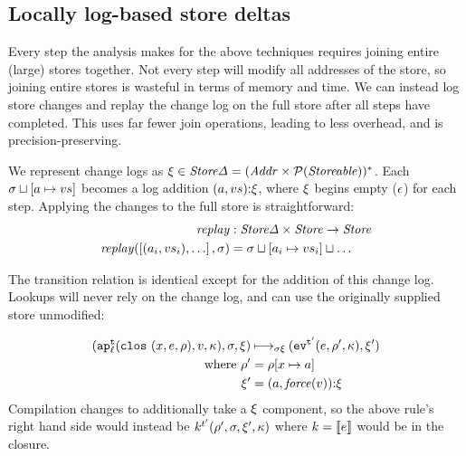 \documentclass[preprint,onecolumn,9pt]{sigplanconf} %
\begin{document}



\subsection{Locally log-based store deltas}

Every step the analysis makes for the above techniques requires
joining entire (large) stores together. Not every step will modify all
addresses of the store, so joining entire stores is wasteful in terms
of memory and time. We can instead log store changes and replay the
change log on the full store after all steps have completed. This uses
far fewer join operations, leading to less overhead, and is precision-preserving.

We represent change logs as $\msdiff \in \StoreDelta = (\Addr \times
  \Set(\Storeable))^*$. Each $\msto\sqcup[\maddr \mapsto \mval{s}]$
 becomes a log addition
$\cons{\ttuple{\maddr}{\mval{s}}}{\msdiff}$, where $\msdiff$ begins
empty ($\mtlst$) for each step. Applying the changes to the full store
is straightforward:
\begin{align*}
\replay &: \StoreDelta \times \Store \to \Store \\
\replay(\left[ \ttuple{\maddr_i}{\mval{s_i}}, \ldots\right], \msto) &= \msto \sqcup [\maddr_i \mapsto \mval{s_i}] \sqcup \ldots
\end{align*}

The transition relation is identical except for the addition of this change log.
%
Lookups will never rely on the change log, and can use the originally supplied store unmodified:

\begin{align*}
(\ap[^\mcntr_\mlab]{\clos{\mvar,\mexp,\menv},\mval,\mkont},\msto,\msdiff) & \dmachstep
(\ev[^{\mcntr'}]{\mexp,\menv',\mkont},\msdiff') \\
\text{ where }\menv' &= \menv[\mvar\mapsto\maddr] \\
              \msdiff' &= 
\spchoice
{\cons{\ttuple{\maddr}{\force(\msto,\mval)}}{\msdiff}}
{\cons{\ttuple{\maddr}{\force(\mval)}}{\msdiff}}
\end{align*}
Compilation changes to additionally take a $\msdiff$ component, so the
above rule's right hand side would instead be $k^{\mcntr'}(\menv',
\msto, \msdiff', \mkont)$ where $k = \compile{e}$ would be in the closure.
\end{document}
